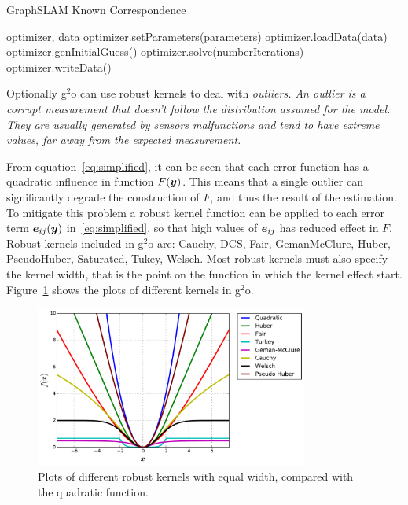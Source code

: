\begin{algorithm}[htbp!]
    \caption{GraphSLAM Known Correspondence}
    \label{alg:known-correspondence}
    \begin{algorithmic}[1]
        \Require optimizer, data
        \State optimizer.setParameters(parameters)
        \State optimizer.loadData(data)
        \State optimizer.genInitialGuess()
        \State optimizer.solve(numberIterations)
        \State optimizer.writeData()
    \end{algorithmic}
\end{algorithm}

Optionally g$^2$o can use robust kernels to deal with \it{outliers}. An outlier is a corrupt measurement that doesn't follow the distribution assumed for the model. They are usually generated by sensors malfunctions and tend to have extreme values, far away from the expected measurement. 

From equation~\eqref{eq:simplified}, it can be seen that each error function has a quadratic influence in function $F(\boldsymbol{y})$. This means that a single outlier can significantly degrade the construction of $F$, and thus the result of the estimation. To mitigate this problem a robust kernel function can be applied to each error term $\boldsymbol{e}_{ij}(\boldsymbol{y})$ in~\eqref{eq:simplified}, so that high values of $\boldsymbol{e}_{ij}$ has reduced effect in $F$. Robust kernels included in g$^2$o are: Cauchy, DCS, Fair, GemanMcClure, Huber, PseudoHuber, Saturated, Tukey, Welsch. Most robust kernels must also specify the kernel width, that is the point on the function in which the kernel effect start. Figure~\ref{fig:kernels} shows the plots of different kernels in g$^2$o. 

\begin{figure}[htbp!]
    \centering
    \includegraphics[width=0.8\textwidth]{imagenes/kernels.pdf}
    \caption[Plots of different kernels.]{Plots of different robust kernels with equal width, compared with the quadratic function.}
    \label{fig:kernels}
\end{figure}

